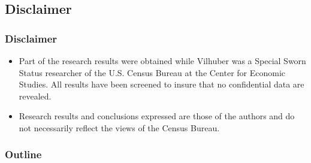 
%
%  
%

\subsection*{Disclaimer}

\begin{slide}
\frametitle{Disclaimer}
\footnotesize
  \begin{itemize}
  \item Part of the research results were obtained while Vilhuber was a
    Special Sworn Status researcher of the U.S. Census Bureau at the
    Center for Economic Studies.  
    All results have been screened to insure that no confidential data are revealed. 
  \item  Research results and conclusions expressed are those of the authors and
    do not necessarily reflect the views of the Census Bureau. 

  \end{itemize}
\end{slide}


\begin{slide}

  \frametitle{Outline}
  \tableofcontents[part=1,hideallsubsections]
\end{slide}



